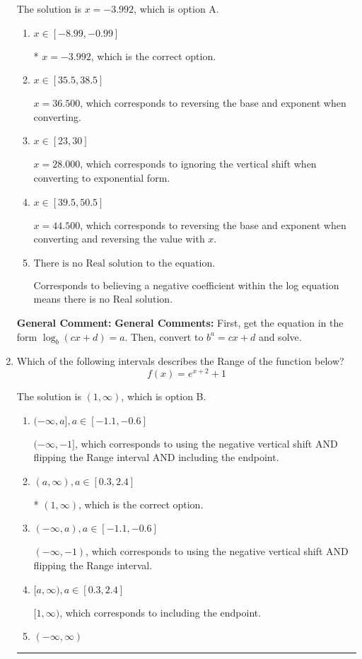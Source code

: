 \documentclass{extbook}[14pt]
\newcommand{\litem}[1]{\item #1

\rule{\textwidth}{0.4pt}}
\begin{document}
\begin{enumerate}
{The solution is \( x = -3.992 \), which is option A.\begin{enumerate}[label=\Alph*.]
\item \( x \in [-8.99, -0.99] \)

* $x = -3.992$, which is the correct option.
\item \( x \in [35.5, 38.5] \)

$x = 36.500$, which corresponds to reversing the base and exponent when converting.
\item \( x \in [23, 30] \)

$x = 28.000$, which corresponds to ignoring the vertical shift when converting to exponential form.
\item \( x \in [39.5, 50.5] \)

$x = 44.500$, which corresponds to reversing the base and exponent when converting and reversing the value with $x$.
\item \( \text{There is no Real solution to the equation.} \)

Corresponds to believing a negative coefficient within the log equation means there is no Real solution.
\end{enumerate}

\textbf{General Comment:} \textbf{General Comments:} First, get the equation in the form $\log_b{(cx+d)} = a$. Then, convert to $b^a = cx+d$ and solve.
}
\litem{
Which of the following intervals describes the Range of the function below?
\[ f(x) = e^{x+2}+1 \]

The solution is \( (1, \infty) \), which is option B.\begin{enumerate}[label=\Alph*.]
\item \( (-\infty, a], a \in [-1.1, -0.6] \)

$(-\infty, -1]$, which corresponds to using the negative vertical shift AND flipping the Range interval AND including the endpoint.
\item \( (a, \infty), a \in [0.3, 2.4] \)

* $(1, \infty)$, which is the correct option.
\item \( (-\infty, a), a \in [-1.1, -0.6] \)

$(-\infty, -1)$, which corresponds to using the negative vertical shift AND flipping the Range interval.
\item \( [a, \infty), a \in [0.3, 2.4] \)

$[1, \infty)$, which corresponds to including the endpoint.
\item \( (-\infty, \infty) \)


\end{enumerate}}
\end{enumerate}
\end{document}
